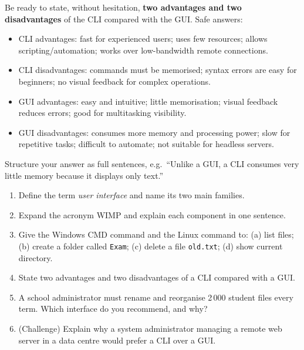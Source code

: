 \documentclass[11pt]{article}
\begin{document}
\begin{aretenir}
Be ready to state, without hesitation, \textbf{two advantages and two disadvantages} of the CLI compared with the GUI. Safe answers:
\begin{itemize}
\item CLI advantages: fast for experienced users; uses few resources; allows scripting/automation; works over low-bandwidth remote connections.
\item CLI disadvantages: commands must be memorised; syntax errors are easy for beginners; no visual feedback for complex operations.
\item GUI advantages: easy and intuitive; little memorisation; visual feedback reduces errors; good for multitasking visibility.
\item GUI disadvantages: consumes more memory and processing power; slow for repetitive tasks; difficult to automate; not suitable for headless servers.
\end{itemize}
Structure your answer as full sentences, e.g.\ ``Unlike a GUI, a CLI consumes very little memory because it displays only text.''
\end{aretenir}

\begin{exercice}
\begin{enumerate}
\item Define the term \emph{user interface} and name its two main families.
\item Expand the acronym WIMP and explain each component in one sentence.
\item Give the Windows CMD command and the Linux command to: (a) list files; (b) create a folder called \texttt{Exam}; (c) delete a file \texttt{old.txt}; (d) show current directory.
\item State two advantages and two disadvantages of a CLI compared with a GUI.
\item A school administrator must rename and reorganise 2\,000 student files every term. Which interface do you recommend, and why?
\item (Challenge) Explain why a system administrator managing a remote web server in a data centre would prefer a CLI over a GUI.
\end{enumerate}
\end{exercice}
\end{document}
